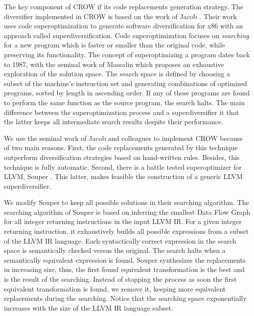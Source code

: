 
The key component of CROW if its code replacements generation strategy. The diversifier implemented in CROW is based on the work of Jacob \etal \cite{jacob2008superdiversifier}. Their work uses code superoptimization to generate software diversification for x86 with an approach called superdiversification. 
Code superoptimization focuses on \emph{searching} for a new program which is faster or smaller than the original code, while preserving its functionality.
The concept of superoptimizing a program dates back to 1987, with the seminal work of Massalin \cite{Massalin1987} which proposes an exhaustive exploration of the solution space. The search space is defined by choosing a subset of the machine's instruction set and generating combinations of optimized programs, sorted by length in ascending order. If any of these programs are found to perform the same function as the source program, the search halts. The main difference between the superoptimization process and a superdiversifier it that the latter keeps all intermediate search results despite their performance. 

We use the seminal work of Jacob and colleagues to implement CROW because of two main reasons.
First, the code replacements generated by this technique outperform diversification strategies based on hand-written rules. Besides, this technique is fully automatic.
Second, there is a battle tested superoptimizer for LLVM, Souper \cite{Sasnauskas2017Souper:Superoptimizer}. This latter, makes feasible the construction of a generic LLVM superdiversifier.

We modify Souper to keep all possible solutions in their searching algorithm. The searching algorithm of Souper is based on inferring the smallest Data Flow Graph for all integer returning instructions in the input LLVM IR. For a given integer returning instruction, it exhaustively builds all possible expressions from a subset of the LLVM IR language.
Each syntactically correct expression in the search space is semantically checked versus the original. The search halts when a semantically equivalent expression is found. Souper synthesizes the replacements in increasing size, thus, the first found equivalent transformation is the best and is the result of the searching. Instead of stopping the process as soon the first equivalent transformation is found, we remove it, keeping more equivalent replacements during the searching. Notice that the searching space exponentially increases with the size of the LLVM IR language subset.

